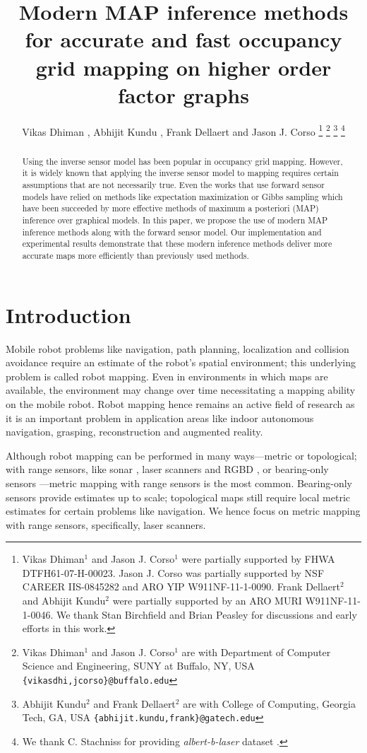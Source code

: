 \documentclass[letterpaper, 10 pt, conference]{ieeeconf} %
\title{\Large \bf
Modern MAP inference methods for accurate and fast occupancy grid mapping on higher
order factor graphs
}
\author{Vikas Dhiman%
, Abhijit Kundu%
, Frank Dellaert
and Jason J. Corso%
  \thanks{%
    Vikas Dhiman$^1$ and Jason J. Corso$^1$ were partially supported by FHWA
    DTFH61-07-H-00023. Jason J. Corso was partially supported by NSF CAREER IIS-0845282 and
    ARO YIP W911NF-11-1-0090.  Frank Dellaert$^2$ and Abhijit Kundu$^2$ were
    partially supported by an ARO MURI W911NF-11-1-0046.  We thank Stan Birchfield
  and Brian Peasley for discussions and early efforts in this work. } 
  \thanks{
    Vikas Dhiman$^{1}$ and Jason J. Corso$^{1}$ are with 
    Department of Computer Science and Engineering, SUNY at Buffalo, NY, USA 
    {{\tt\small\{vikasdhi,jcorso\}@buffalo.edu}}
  }
  \thanks{
    Abhijit Kundu$^{2}$ and Frank Dellaert$^{2}$ are with 
    College of Computing, Georgia Tech, GA, USA
    {{\tt\small\{abhijit.kundu,frank\}@gatech.edu}}
  }
  \thanks{We thank C. Stachniss for providing \emph{albert-b-laser} dataset \cite{howard2003radish}.}
}
\begin{document}
\maketitle
\begin{abstract}
Using the inverse sensor model has been popular in occupancy grid mapping. 
However, it is widely known that applying the inverse sensor model to mapping 
requires certain assumptions that are not necessarily true. Even the works
that use forward sensor models have relied on methods like expectation
maximization or Gibbs sampling which have been succeeded by more effective
methods of maximum a posteriori (MAP) inference over graphical models. In this
paper, we propose the use of modern MAP inference methods along with the
forward sensor model. Our implementation and experimental results demonstrate
that these modern inference methods deliver more accurate maps more
efficiently than previously used methods.
\end{abstract}
\section{Introduction}

Mobile robot problems like navigation, path planning, localization and collision 
avoidance require an estimate of the robot's spatial environment; this 
underlying problem is called robot mapping\cite{thrun2002robotic}.  Even in 
environments in which maps are available, the environment may change over time 
necessitating a mapping ability on the mobile robot.  Robot mapping hence 
remains an active field of research 
\cite{meyer2012occupancy,nagla2012improved,merali2013icra} as it is an important 
problem in application areas like indoor autonomous navigation, grasping, 
reconstruction and augmented reality.

Although robot mapping can be performed in many ways---metric or topological; 
with range sensors, like sonar \cite{thrun2003learning}, laser scanners 
\cite{thrun2003learning} and RGBD \cite{newcombe2011kinectfusion}, or 
bearing-only sensors \cite{davison2007monoslam,kundu2011realtime}---metric 
mapping with range sensors is the most common.  Bearing-only sensors provide 
estimates up to scale; topological maps still require local metric 
estimates for certain problems like navigation.  We hence focus on metric 
mapping with range sensors, specifically, laser scanners.
\end{document}
